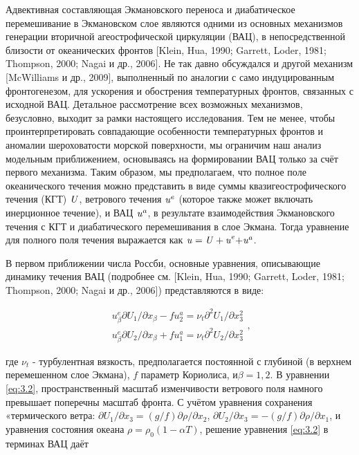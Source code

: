 Адвективная составляющая Экмановского переноса и диабатическое перемешивание в Экмановском слое являются одними из основных механизмов генерации вторичной агеострофической циркуляции (ВАЦ), в непосредственной близости от океанических фронтов [Klein, Hua, 1990; Garrett, Loder, 1981; Thompson, 2000; Nagai и др., 2006]. Не так давно обсуждался и другой механизм [McWilliams и др., 2009], выполненный по аналогии с само индуцированным фронтогенезом, для ускорения и обострения температурных фронтов, связанных с исходной ВАЦ. Детальное рассмотрение всех возможных механизмов, безусловно, выходит за рамки настоящего исследования. Тем не менее, чтобы проинтерпретировать совпадающие особенности температурных фронтов и аномалии шероховатости морской поверхности, мы ограничим наш анализ модельным приближением, основываясь на формировании ВАЦ только за счёт первого механизма. Таким образом, мы предполагаем, что полное поле океанического течения можно представить в виде суммы квазигеострофического течения (КГТ) ${\it U}$, ветрового течения ${\it u}^{e} $ (которое также может включать инерционное течение), и ВАЦ ${\it u}^{a} $, в результате взаимодействия Экмановского течения с КГТ и диабатического перемешивания в слое Экмана. Тогда уравнение для полного поля течения выражается как ${\it u=U+u}^{e} {\it +u}^{a} $.

В первом приближении числа Россби, основные уравнения, описывающие динамику течения ВАЦ (подробнее см. [Klein, Hua, 1990; Garrett, Loder, 1981; Thompson, 2000; Nagai и др., 2006]) представляются в виде:



\begin{equation} \label{eq:3.2} \begin{array}{l} {u_{\beta }^{e} \partial U_{1} /\partial x_{\beta } -fu_{2}^{a} =\nu _{t} \partial ^{2} U_{1} /\partial x_{3}^{2} } \\ {u_{\beta }^{e} \partial U_{2} /\partial x_{\beta } +fu_{1}^{a} =\nu _{t} \partial ^{2} U_{2} /\partial x_{3}^{2} } \end{array},  \end{equation} 



\noindent где $\nu _{t} $ - турбулентная вязкость, предполагается постоянной с глубиной (в верхнем перемешенном слое Экмана), $f$ параметр Кориолиса, и$\beta =1,2$. В уравнении \eqref{eq:3.2}, пространственный масштаб изменчивости ветрового поля намного превышает поперечны масштаб фронта. С учётом уравнения сохранения «термического ветра: $\partial U_{1} /\partial x_{3} =(g/f)\partial \rho /\partial x_{2} $, $\partial U_{2} /\partial x_{3} =-(g/f)\partial \rho /\partial x_{1} $, и уравнения состояния океана $\rho =\rho _{0} (1-\alpha T)$, решение уравнения \eqref{eq:3.2} в терминах ВАЦ даёт



